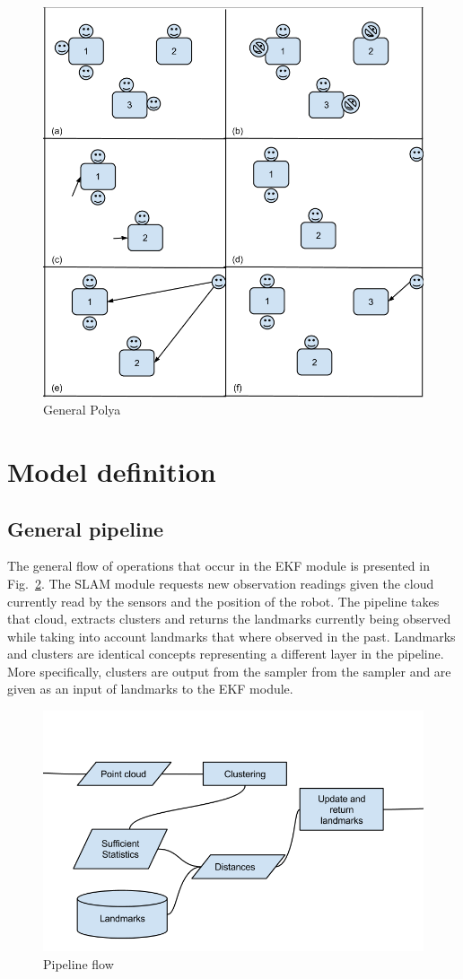 \documentclass[]{article}
\begin{document}
\begin{figure}
    \includegraphics[width=0.9\linewidth]{generalPolya}
    \caption{General Polya}
    \label{generalPolya}
\end{figure}


\section{Model definition}
\label{sec:model}

    \subsection{General pipeline}

    The general flow of operations that occur in the EKF module is presented in Fig.~\ref{pipeline}. The SLAM module requests new observation readings given the cloud currently read by the sensors and the position of the robot. The pipeline takes that cloud, extracts clusters and returns the landmarks currently being observed while taking into account landmarks that where observed in the past. Landmarks and clusters are identical concepts representing a different layer in the pipeline. More specifically, clusters are output from the sampler from the sampler and are given as an input of landmarks to the EKF module.

    \begin{figure}
        \centering
        \includegraphics[width=.4\textwidth]{workflowSpec}
        \caption{Pipeline flow}
        \label{pipeline}
    \end{figure}
\end{document}
